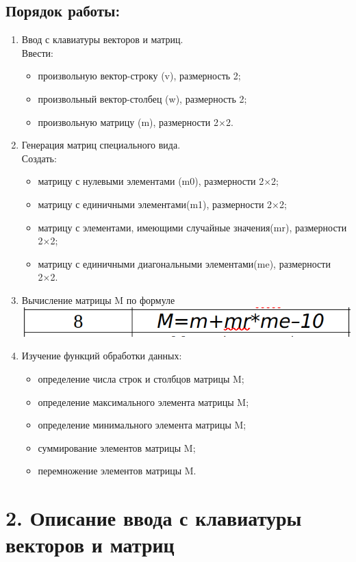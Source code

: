 \documentclass[12pt]{article}
\begin{document}
\subsection*{Порядок работы:}
\begin{enumerate}
	\item Ввод с клавиатуры векторов и матриц.\\
		Ввести:
		\begin{itemize}
			\item произвольную вектор-строку (v), размерность 2;
			\item произвольный вектор-столбец (w), размерность 2;
			\item произвольную матрицу (m), размерности 2×2.
		\end{itemize}
	\item Генерация матриц специального вида.\\
		Создать:
		\begin{itemize}
			\item матрицу с нулевыми элементами (m0), размерности 2×2;
			\item матрицу с единичными элементами(m1), размерности 2×2;
			\item матрицу с элементами, имеющими случайные значения(mr), размерности 2×2;
			\item матрицу с единичными диагональными элементами(me), размерности 2×2.
		\end{itemize}
	\item Вычисление матрицы M по формуле\\
		\includegraphics[width=0.5\linewidth]{formula.png}
	\item Изучение функций обработки данных:
		\begin{itemize}
			\item определение числа строк и столбцов матрицы M;
			\item определение максимального элемента матрицы M;
			\item определение минимального элемента матрицы M;
			\item суммирование элементов матрицы M;
			\item перемножение элементов матрицы M.
		\end{itemize}
\end{enumerate}

 \section*{2. Описание ввода с клавиатуры векторов и матриц}%
 
\end{document}
